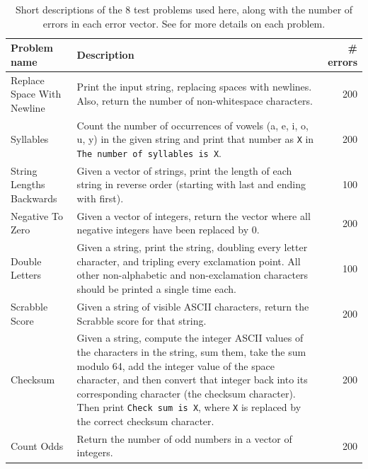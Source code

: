 \begin{table}
\centering
	\caption{Short descriptions of the 8 test problems used here, along with the number of errors in each error vector. See \citep{Helmuth:2015:GECCO} for more details on each problem.}
	\label{tab:problems}
	\begin{tabular}{lp{7.0cm}r}
		\hline
		Problem name \quad & Description \quad & \# errors \\
		\hline
		Replace Space With Newline & Print the input string, replacing spaces with newlines. Also, return the number of non-whitespace characters. & 200 \\
		Syllables & Count the number of occurrences of vowels (a, e, i, o, u, y) in the given string and print that number as \texttt{X} in \texttt{The number of syllables is X}. & 200 \\
		String Lengths Backwards & Given a vector of strings, print the length of each string in reverse order (starting with last and ending with first). & 100 \\
		Negative To Zero & Given a vector of integers, return the vector where all negative integers have been replaced by 0. & 200 \\
		Double Letters & Given a string, print the string, doubling every letter character, and tripling every exclamation point. All other non-alphabetic and non-exclamation characters should be printed a single time each. & 100 \\
		Scrabble Score & Given a string of visible ASCII characters, return the Scrabble score for that string. & 200 \\
		Checksum & Given a string, compute the integer ASCII values of the characters in the string, sum them, take the sum modulo 64, add the integer value of the space character, and then convert that integer back into its corresponding character (the checksum character). Then print \texttt{Check sum is X}, where \texttt{X} is replaced by the correct checksum character. & 200 \\
		Count Odds & Return the number of odd numbers in a vector of integers. & 200 \\
		\hline
	\end{tabular}
\end{table}


